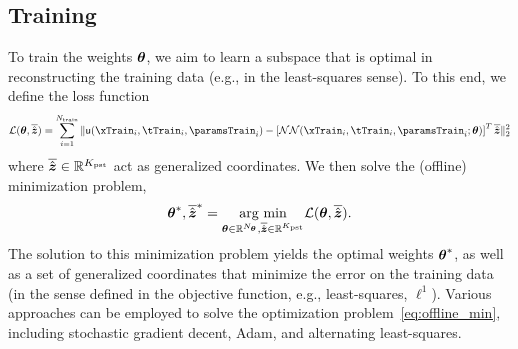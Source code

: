 \documentclass[3p,computermodern,10pt]{elsarticle}
\begin{document}
\subsection{Training}
To train the weights $\boldsymbol \theta$, we aim to learn a subspace that is optimal in reconstructing the training data (e.g., in the least-squares sense). To this end, we define the loss function 
$$\mathcal{L}(\NNWeights,\ParametricSpaceTimeGenStateNN) = \sum_{i=1}^{\NTrain} \| \PDEState(\xTrain_i,\tTrain_i,\paramsTrain_i) - \left[\NeuralNetwork(\xTrain_i,\tTrain_i,\paramsTrain_i;\weights)\right]^T \ParametricSpaceTimeGenStateNN \|_2^2$$  
where $\overline{\hat{\boldsymbol z}} \in \mathbb{R}^{K_{\text{pst}}}$ act as generalized coordinates. We then solve the (offline) minimization problem,
\begin{equation}\label{eq:offline_min}
\boldsymbol \theta^*,\overline{\hat{\boldsymbol z}}^* = \underset{ \boldsymbol \theta \in \mathbb{R}^{N_{\boldsymbol \theta}},\overline{\hat{\boldsymbol z}} \in \mathbb{R}^{K_{\text{pst}}}}{\text{arg min}} \mathcal{L}(\boldsymbol \theta,\overline{\hat{\boldsymbol z}}).
\end{equation} 
The solution to this minimization problem yields the optimal weights $\boldsymbol \theta^*$, as well as a set of generalized coordinates that minimize the error on the training data (in the sense defined in the objective function, e.g., least-squares, $\ell^1$). Various approaches can be employed to solve the optimization problem~\eqref{eq:offline_min}, including stochastic gradient decent, Adam, and alternating least-squares.
\end{document}
